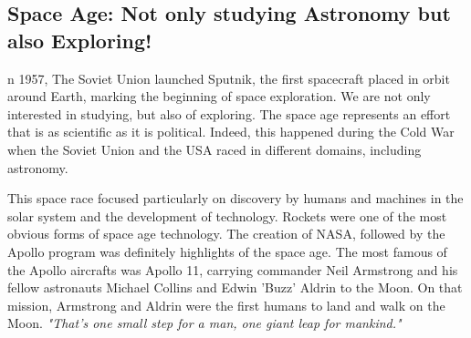 \subsection{Space Age: Not only studying Astronomy but also Exploring!}
n 1957, The Soviet Union launched Sputnik, the first spacecraft placed in orbit around Earth, marking the beginning of space exploration.
We are not only interested in studying, but also of exploring.
The space age represents an effort that is as scientific as it is political.
Indeed, this happened during the Cold War when the Soviet Union and the USA raced in different domains, including astronomy.

This space race focused particularly on discovery by humans and machines in the solar system and the development of technology.
Rockets were one of the most obvious forms of space age technology.
The creation of NASA, followed by the Apollo program was definitely highlights of the space age.
The most famous of the Apollo aircrafts was Apollo 11, carrying commander Neil Armstrong and his fellow astronauts Michael Collins and Edwin 'Buzz' Aldrin to the Moon.
On that mission, Armstrong and Aldrin were the first humans to land and walk on the Moon.
\emph{"That's one small step for a man, one giant leap for mankind."}
\cite{SpaceAge}